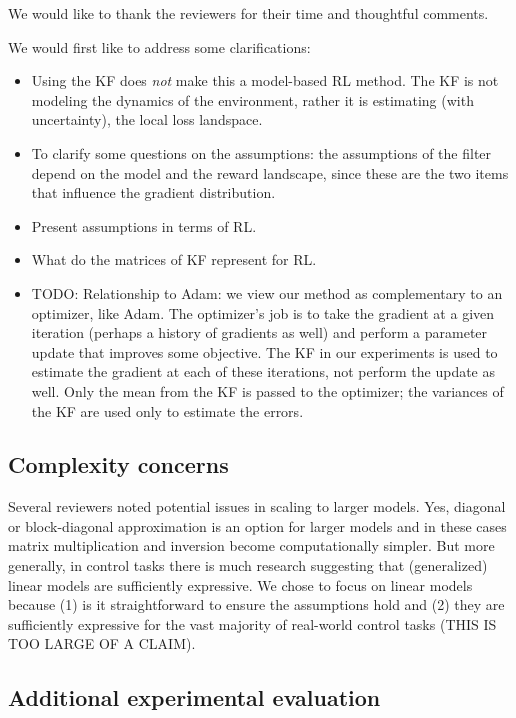 \documentclass{article}
\begin{document}
	We would like to thank the reviewers for their time and thoughtful comments. 
	
	We would first like to address some clarifications:
	\begin{itemize}
		\item Using the KF does \textit{not} make this a model-based RL method. The KF is not modeling the dynamics of the environment, rather it is estimating (with uncertainty), the local loss landspace.
    		\item To clarify some questions on the assumptions: the assumptions of the filter depend on the model and the reward landscape, since these are the two items that influence the gradient distribution.
    		\item Present assumptions in terms of RL.
    		\item What do the matrices of KF represent for RL.	

    		\item TODO: Relationship to Adam: we view our method as complementary to an optimizer, like Adam. The optimizer's job is to take the gradient at a given iteration (perhaps a history of gradients as well) and perform a parameter update that improves some objective. The KF in our experiments is used to estimate the gradient at each of these iterations, not perform the update as well. Only the mean from the KF is passed to the optimizer; the variances of the KF are used only to estimate the errors.
	\end{itemize}
    
    \subsection{Complexity concerns}
    		Several reviewers noted potential issues in scaling to larger models. 
    		Yes, diagonal or block-diagonal approximation is an option for larger models and in these cases matrix multiplication and inversion become computationally simpler. 
    		But more generally, in control tasks there is much research suggesting that (generalized) linear models are sufficiently expressive. We chose to focus on linear models because (1) is it straightforward to ensure the assumptions hold and (2) they are sufficiently expressive for the vast majority of real-world control tasks (THIS IS TOO LARGE OF A CLAIM).
    		

	\subsection{Additional experimental evaluation}
	
\end{document}

